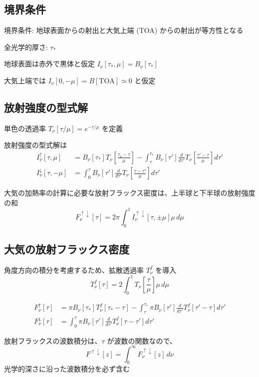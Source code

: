 \documentclass[article]{dennou777}
\begin{document}
\subsection{境界条件}
境界条件: 地球表面からの射出と大気上端 (TOA) からの射出が等方性となる

全光学的厚さ: $\tau_*$

地球表面は赤外で黒体と仮定 $I_\nu[\tau_*,\mu]=B_\nu[\tau_*]$

大気上端では $I_\nu[0,-\mu]=B[\mathrm{TOA}]\simeq0$ と仮定

\subsection{放射強度の型式解}
単色の透過率 $T_\nu[\tau/\mu]=e^{-\tau/\mu}$ を定義

放射強度の型式解は
\begin{align}
	I^\uparrow_\nu[\tau,\mu]
		&=B_\nu[\tau_*]T_\nu\left[\frac{\tau_\nu-\tau}{\mu}\right]
		-\int^{\tau_*}_\tau B_\nu[\tau']\frac{d}{d\tau'}T_\nu\left[\frac{\tau'-\tau}{\mu}\right]d\tau'\\
	I^\downarrow_\nu[\tau,-\mu]
		&=\int^\tau_0 B_\nu[\tau']\frac{d}{d\tau'}T_\nu\left[\frac{\tau-\tau'}{\mu}\right]d\tau'
\end{align}

大気の加熱率の計算に必要な放射フラックス密度は、上半球と下半球の放射強度の和
\begin{equation}
	F^{\uparrow\downarrow}_\nu[\tau]=2\pi\int^1_0 I^{\uparrow\downarrow}_\nu[\tau,\pm\mu]\mu\,d\mu
\end{equation}

\subsection{大気の放射フラックス密度}
角度方向の積分を考慮するため、拡散透過率 $T^f_\nu$ を導入
\begin{equation}
	T^f_\nu[\tau]=2\int^1_0 T_\nu\left[\frac{\tau}{\mu}\right]\mu\,d\mu
\end{equation}

\begin{align}
	F^\uparrow_\nu[\tau]
		&=\pi B_\nu[\tau_*]T^f_\nu[\tau_*-\tau]
		-\int^{\tau_*}_\tau \pi B_\nu[\tau']\frac{d}{d\tau'}T^f_\nu[\tau'-\tau]d\tau'\\
	F^\downarrow_\nu[\tau]
		&=\int^\tau_0 \pi B_\nu[\tau']\frac{d}{d\tau'}T^f_\nu[\tau-\tau']d\tau'
\end{align}

放射フラックスの波数積分は、$\tau$ が波数の関数なので、
\begin{equation}
	F^{\uparrow\downarrow}[z]=\int^\infty_0 F^{\uparrow\downarrow}_\nu[z]\,d\nu
\end{equation}
光学的深さに沿った波数積分を必ず含む
\end{document}
